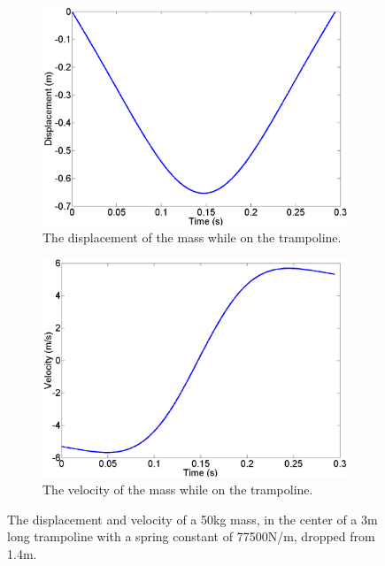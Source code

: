 \begin{figure}[H]
	\centering
    \begin{subfigure}{0.45\textwidth}
		\includegraphics[width=\textwidth]{1MM_Disp.png}
    	\caption{The displacement of the mass while on the trampoline.}\label{fig:1MM_Disp}
    \end{subfigure}\hfill
	\begin{subfigure}{0.45\textwidth}
		\includegraphics[width=\textwidth]{1MM_Vel.png}
    	\caption{The velocity of the mass while on the trampoline.}\label{fig:1MM_Vel}
    \end{subfigure}\hfill
    \caption{The displacement and velocity of a 50kg mass, in the center of a 3m long trampoline with a spring constant of 77500N/m, dropped from 1.4m. }\label{fig:1MM_Disp_Vel}
\end{figure}


